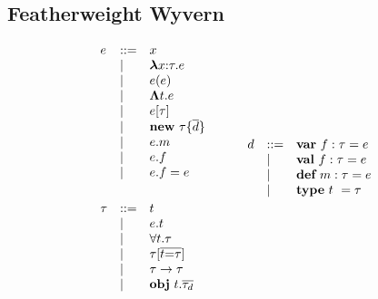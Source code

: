 \documentclass[11pt]{article}
\newcommand{\keyw}[1]{\textbf{#1}}
\begin{document}
\begin{sloppypar}

\subsection{Featherweight Wyvern}

\begin{figure}
\centering
\[
\begin{array}{lll}

e    & \bnfdef & x \\
     & \bnfalt & \boldsymbol\lambda x{:}\tau . e \\
     & \bnfalt & e(e) \\
     & \bnfalt & \boldsymbol\Lambda t . e \\
     & \bnfalt & e[\tau] \\
     & \bnfalt & \keyw{new}~ \tau \{ \overline{d} \} \\	%
     & \bnfalt & e.m \\
     & \bnfalt & e.f \\
     & \bnfalt & e.f = e \\
\\[1ex]

\tau & \bnfdef & t\\
     & \bnfalt & e.t\\				%
     & \bnfalt & \forall t . \tau\\
     & \bnfalt & \tau[\overline{t{=}\tau}]\\
     & \bnfalt & \tau \rightarrow \tau \\
     & \bnfalt & \keyw{obj}~ t . \overline{\tau_d}\\ %
\\[1ex]

\end{array}
\begin{array}{lll}
~~~~
\end{array}
\begin{array}{lll}
	 
d    & \bnfdef & \keyw{var}~ f:\tau = e \\
     & \bnfalt & \keyw{val}~ f:\tau = e \\
     & \bnfalt & \keyw{def}~ m:\tau = e \\
     & \bnfalt & \keyw{type}~ t~ = \tau  \\
\\[1ex]


\end{array}\]
\end{figure}
\end{sloppypar}
\end{document}

